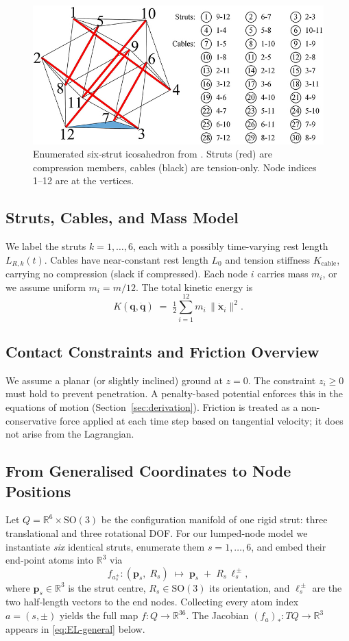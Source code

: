 \documentclass[12pt,letterpaper]{article}
\newcommand{\R}{\mathbb{R}}
\newcommand{\q}{\bm{q}}
\newcommand{\qd}{\dot{\bm{q}}}
\newcommand{\x}{\bm{x}}
\begin{document}
\begin{figure}[H]
    \centering
    \includegraphics[width=.9\linewidth]{icosahedron_diagram.jpg}
    \caption{Enumerated six‑strut icosahedron from \cite{Cai2020}.
    Struts (red) are compression members, cables (black) are tension-only.
    Node indices 1--12 are at the vertices.}
    \label{fig:icosahedron}
\end{figure}

\subsection{Struts, Cables, and Mass Model}
We label the struts $k=1,\dots,6$, each with a possibly time-varying rest length $L_{R,k}(t)$. Cables have near-constant rest length $L_0$ and tension stiffness $K_{\mathrm{cable}}$, carrying no compression (slack if compressed). Each node $i$ carries mass $m_i$, or we assume uniform $m_i=m/12$. The total kinetic energy is
\begin{equation}
    K(\q,\qd) \;=\;\tfrac12 \sum_{i=1}^{12} m_i\, \|\dot{\x}_i\|^2.
    \label{eq:Kdef-main}
\end{equation}

\subsection{Contact Constraints and Friction Overview}
We assume a planar (or slightly inclined) ground at $z=0$. The constraint $z_i\ge 0$ must hold to prevent penetration. A penalty-based potential enforces this in the equations of motion (Section~\ref{sec:derivation}). Friction is treated as a non-conservative force applied at each time step based on tangential velocity; it does not arise from the Lagrangian.

\subsection{From Generalised Coordinates to Node Positions}
\label{sec:Q2R3}
Let $Q=\R^{6}\times\mathrm{SO}(3)$ be the configuration manifold of one rigid
strut: three translational and three rotational DOF.  For our lumped‑node model
we instantiate \emph{six} identical struts, enumerate them $s=1,\dots,6$, and
embed their end‑point atoms into $\R^{3}$ via
\[
  f_{a_s^\pm} :
  (\bm{p}_s,\;R_s) \;\longmapsto\;
  \bm{p}_s \;+\; R_s\,\bm{\ell}_{s}^{\,\pm},
\]
where $\bm{p}_s\in\R^{3}$ is the strut centre, $R_s\!\in\!\mathrm{SO}(3)$ its
orientation, and $\bm{\ell}_{s}^{\,\pm}$ are the two half‑length vectors to the
end nodes.  Collecting every atom index $a=(s,\pm)$ yields the full map
$f:Q\to\R^{36}$. The Jacobian $(f_a)_{*}:TQ\to\R^{3}$ appears in \eqref{eq:EL-general} below.
\end{document}
